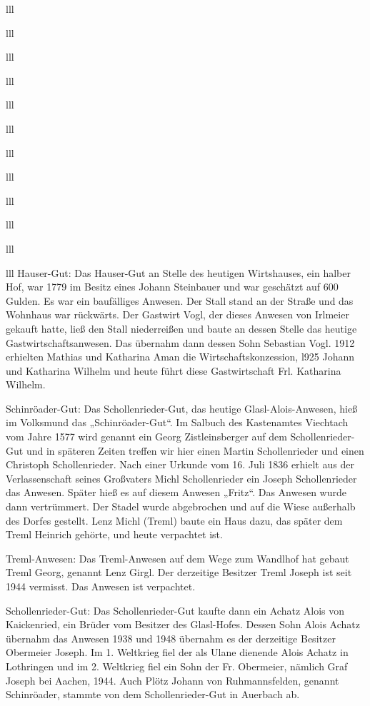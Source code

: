 \documentclass[12pt,a4pager]{book}
\begin{document}
\begin{tabuluar}{lll}
\begin{tabuluar}{lll}
\begin{tabuluar}{lll}
\begin{tabuluar}{lll}
\begin{tabuluar}{lll}
\begin{tabuluar}{lll}
\begin{tabuluar}{lll}
\begin{tabuluar}{lll}
\begin{tabuluar}{lll}
\begin{tabuluar}{lll}
\begin{tabuluar}{lll}
\begin{tabuluar}{lll}
Hauser-Gut: Das Hauser-Gut an Stelle des heutigen Wirtshauses, ein halber Hof,
war 1779 im Besitz eines Johann Steinbauer und war geschätzt auf 600 Gulden. Es
war ein baufälliges Anwesen. Der Stall stand an der Straße und das Wohnhaus war
rückwärts. Der Gastwirt Vogl, der dieses Anwesen von Irlmeier gekauft hatte,
ließ den Stall niederreißen und baute an dessen Stelle das heutige
Gastwirtschaftsanwesen. Das übernahm dann dessen Sohn Sebastian Vogl. 1912
erhielten Mathias und Katharina Aman die Wirtschaftskonzession, l925 Johann und
Katharina Wilhelm und heute führt diese Gastwirtschaft Frl. Katharina Wilhelm.

Schinröader-Gut: Das Schollenrieder-Gut, das heutige Glasl-Alois-Anwesen, hieß
im Volksmund das „Schinröader-Gut“. Im Salbuch des Kastenamtes Viechtach vom
Jahre 1577 wird genannt ein Georg Zistleinsberger auf dem Schollenrieder-Gut und
in späteren Zeiten treffen wir hier einen Martin Schollenrieder und einen
Christoph Schollenrieder. Nach einer Urkunde vom 16. Juli 1836 erhielt aus der
Verlassenschaft seines Großvaters Michl Schollenrieder ein Joseph Schollenrieder
das Anwesen. Später hieß es auf diesem Anwesen „Fritz“. Das Anwesen wurde dann
vertrümmert. Der Stadel wurde abgebrochen und auf die Wiese außerhalb des Dorfes
gestellt. Lenz Michl (Treml) baute ein Haus dazu, das später dem Treml Heinrich
gehörte, und heute verpachtet ist.

Treml-Anwesen: Das Treml-Anwesen auf dem Wege zum Wandlhof hat gebaut Treml
Georg, genannt Lenz Girgl. Der derzeitige Besitzer Treml Joseph ist seit 1944
vermisst. Das Anwesen ist verpachtet.

Schollenrieder-Gut: Das Schollenrieder-Gut kaufte dann ein Achatz Alois von
Kaickenried, ein Brüder vom Besitzer des Glasl-Hofes. Dessen Sohn Alois Achatz
übernahm das Anwesen 1938 und 1948 übernahm es der derzeitige Besitzer Obermeier
Joseph. Im 1. Weltkrieg fiel der als Ulane dienende Alois Achatz in Lothringen
und im 2. Weltkrieg fiel ein Sohn der Fr. Obermeier, nämlich Graf Joseph bei
Aachen, 1944. Auch Plötz Johann von Ruhmannsfelden, genannt Schinröader, stammte
von dem Schollenrieder-Gut in Auerbach ab.


\end{tabuluar}
\end{tabuluar}
\end{tabuluar}
\end{tabuluar}
\end{tabuluar}
\end{tabuluar}
\end{tabuluar}
\end{tabuluar}
\end{tabuluar}
\end{tabuluar}
\end{tabuluar}
\end{tabuluar}
\end{document}
